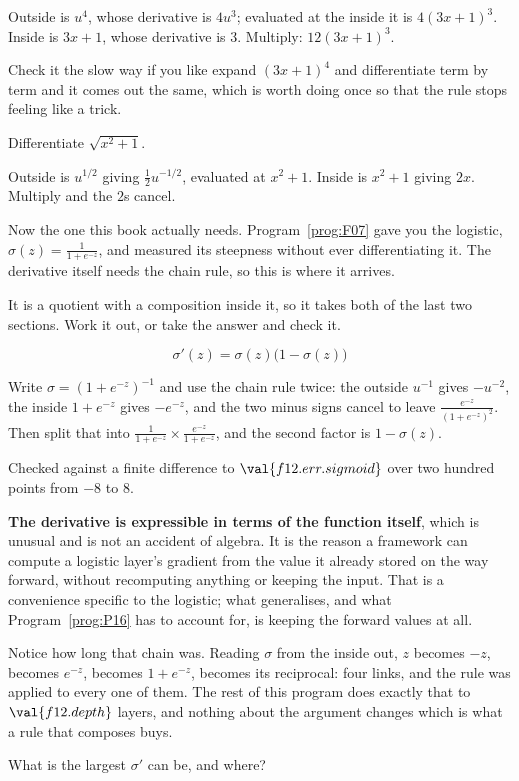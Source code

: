 \begin{fr}
Outside is $u^{4}$, whose derivative is $4u^{3}$; evaluated at the inside it
is $4(3x+1)^{3}$. Inside is $3x+1$, whose derivative is $3$. Multiply:
$12(3x+1)^{3}$.

Check it the slow way if you like \dash{} expand $(3x+1)^{4}$ and
differentiate term by term \dash{} and it comes out the same, which is worth
doing once so that the rule stops feeling like a trick.

Differentiate $\sqrt{x^{2} + 1}$.
\nextframe
\end{fr}

\begin{fr}
Outside is $u^{1/2}$ giving $\frac{1}{2}u^{-1/2}$, evaluated at $x^{2}+1$.
Inside is $x^{2}+1$ giving $2x$. Multiply and the $2$s cancel.

Now the one this book actually needs. Program~\ref{prog:F07} gave you the
logistic, $\sigma(z) = \frac{1}{1 + e^{-z}}$, and measured its steepness
without ever differentiating it. The derivative itself needs the chain rule,
so this is where it arrives.

It is a quotient with a composition inside it, so it takes both of the last
two sections. Work it out, or take the answer and check it.
\dotline
\nextframe
\end{fr}

\begin{fr}
\begin{ansblock}
\[ \sigma'(z) = \sigma(z)\bigl(1 - \sigma(z)\bigr) \]
\end{ansblock}

Write $\sigma = (1 + e^{-z})^{-1}$ and use the chain rule twice: the outside
$u^{-1}$ gives $-u^{-2}$, the inside $1 + e^{-z}$ gives $-e^{-z}$, and the two
minus signs cancel to leave $\frac{e^{-z}}{(1+e^{-z})^{2}}$. Then split that
into $\frac{1}{1+e^{-z}} \times \frac{e^{-z}}{1+e^{-z}}$, and the second
factor is $1 - \sigma(z)$.

Checked against a finite difference to $\val{f12.err.sigmoid}$ over two
hundred points from $-8$ to $8$.

\begin{note}
\textbf{The derivative is expressible in terms of the function itself}, which
is unusual and is not an accident of algebra. It is the reason a framework can
compute a logistic layer's gradient from the value it already stored on the
way forward, without recomputing anything or keeping the input. That is a
convenience specific to the logistic; what generalises, and what
Program~\ref{prog:P16} has to account for, is keeping the forward values at
all.
\end{note}

Notice how long that chain was. Reading $\sigma$ from the inside out, $z$
becomes $-z$, becomes $e^{-z}$, becomes $1 + e^{-z}$, becomes its reciprocal:
four links, and the rule was applied to every one of them. The rest of this
program does exactly that to $\val{f12.depth}$ layers, and nothing about the
argument changes \dash{} which is what a rule that composes buys.

What is the largest $\sigma'$ can be, and where?
\nextframe
\end{fr}

